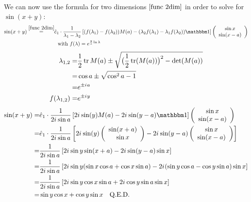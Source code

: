 \documentclass{article}
\renewcommand{\i}{{i\mkern1mu}}
\begin{document}
We can now use the formula for two dimensions $\eqref{func 2dim}$ in order to solve for $\sin(x+y)$:
\begin{align}
\sin(x+y) \overset{\eqref{func 2dim}}=& \hat e_1 \cdot \frac 1{\lambda_1 - \lambda_2} \left[(f(\lambda_1) - f(\lambda_2))M(a) - (\lambda_2 f(\lambda_1) - \lambda_1 f(\lambda_2)) \mathbbm 1\right] \left(\begin{array}{c} \sin x \\ \sin(x-a) \end{array}\right) \nonumber\\
&\ \ \text{with}\ f(\lambda) = e^{\frac ya \ln\lambda}
\end{align}
\begin{align}
\lambda_{1,2} =& \frac 12\tr M(a) \pm \sqrt{\big(\frac 12\tr (M(a))\big)^2 - \det(M(a))}\nonumber\\
=& \cos a \pm \sqrt{\cos^2 a - 1}\nonumber\\
=& e^{\pm \i a}\\
f(\lambda_{1,2}) =& e^{\pm \i y}
\end{align}
\begin{align}
\sin(x+y) =& \hat e_1 \cdot \frac 1{2\i \sin a} \left[2\i \sin(y) M(a) - 2\i \sin(y - a) \mathbbm 1\right] \left(\begin{array}{c} \sin x \\ \sin(x-a) \end{array}\right) \nonumber\\
=& \hat e_1 \cdot \frac 1{2\i \sin a} \left[2\i \sin(y)  \left(\begin{array}{c} \sin(x+a) \\ \sin x \end{array}\right) - 2\i \sin(y - a) \left(\begin{array}{c} \sin x \\ \sin(x-a) \end{array}\right) \right] \nonumber\\
=& \frac 1{2\i \sin a} \left[2\i \sin y \sin(x+a) - 2\i \sin(y - a) \sin x \right] \nonumber\\
=& \frac 1{2\i \sin a} \left[2\i \sin y (\sin x \cos a + \cos x \sin a) - 2\i (\sin y \cos a - \cos y \sin a) \sin x \right] \nonumber\\
=& \frac 1{2\i \sin a} \left[2\i \sin y \cos x \sin a + 2\i \cos y \sin a \sin x \right] \nonumber\\
=& \sin y \cos x + \cos y \sin x\ \ \ \text{Q.E.D.}
\end{align}
\end{document}
